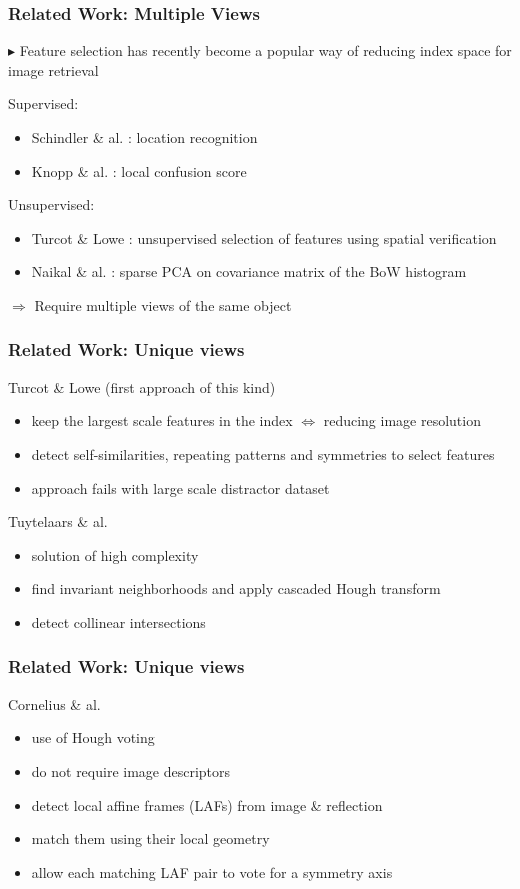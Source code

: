\documentclass[11pt]{beamer}
\begin{document}
\begin{frame}
\frametitle{Related Work: Multiple Views}
$\blacktriangleright$ Feature selection has recently become a popular way of reducing index space for image retrieval

\vspace{0.3cm}

Supervised:
\begin{itemize}
\item Schindler \& al. : location recognition
\item Knopp \& al. : local confusion score
\end{itemize}
\vspace{0.3cm}
Unsupervised:
\begin{itemize}
\item Turcot \& Lowe : unsupervised selection of features using spatial verification
\item Naikal \& al. : sparse PCA on covariance matrix of the BoW histogram
\end{itemize}

$\Rightarrow$ Require multiple views of the same object

\end{frame}

\begin{frame}
\frametitle{Related Work: Unique views}
Turcot \& Lowe (first approach of this kind)
\begin{itemize}
\item keep the largest scale features in the index $\Leftrightarrow$ reducing image resolution
\item detect self-similarities, repeating patterns and symmetries to select features
\item approach fails with large scale distractor dataset 
\end{itemize}
\vspace{0.3cm}
Tuytelaars \& al.
\begin{itemize}
\item solution of high complexity
\item find invariant neighborhoods and apply cascaded Hough transform
\item detect collinear intersections
\end{itemize}
\end{frame}
\begin{frame}
\frametitle{Related Work: Unique views}
Cornelius \& al.
\begin{itemize}
\item use of Hough voting
\item do not require image descriptors
\item detect local affine frames (LAFs) from image \& reflection
\item match them using their local geometry
\item allow each matching LAF pair to vote for a symmetry axis
\end{itemize}
\end{frame}
\end{document}
